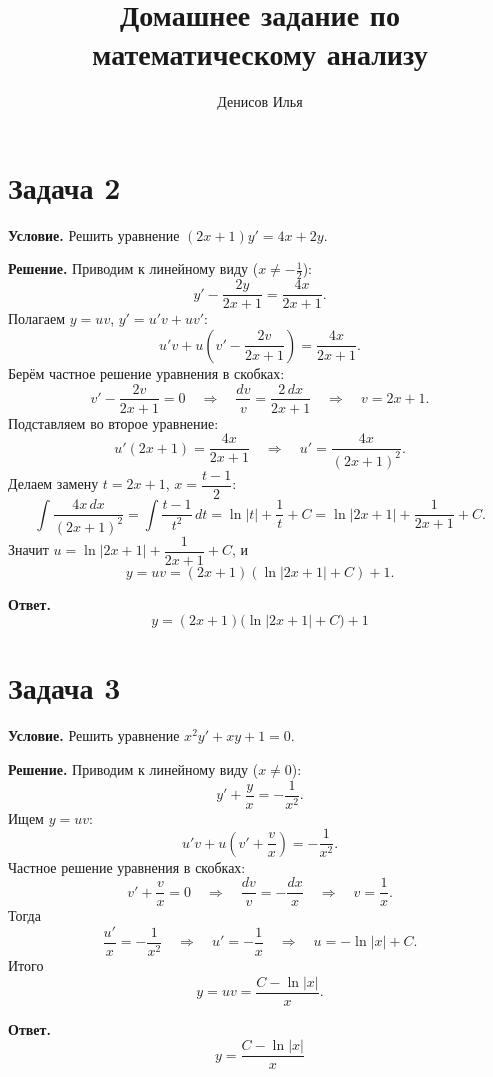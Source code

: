 \documentclass[12pt]{article}
\title{Домашнее задание по математическому анализу}
\author{Денисов Илья}
\date{}
\begin{document}
	\maketitle

	\section*{Задача 2}

	\noindent
	\textbf{Условие.} Решить уравнение $(2x+1)y' = 4x + 2y$.

	\noindent
	\textbf{Решение.} Приводим к линейному виду ($x \ne -\tfrac{1}{2}$):
	\[
		y' - \frac{2y}{2x+1} = \frac{4x}{2x+1}.
	\]
	Полагаем $y = uv$, $y' = u'v + uv'$:
	\[
		u'v + u\left( v' - \frac{2v}{2x+1} \right) = \frac{4x}{2x+1}.
	\]
	Берём частное решение уравнения в скобках:
	\[
		v' - \frac{2v}{2x+1} = 0 \quad \Longrightarrow \quad \frac{dv}{v} = \frac{2\,dx}{2x+1} \quad \Longrightarrow \quad v = 2x+1.
	\]
	Подставляем во второе уравнение:
	\[
		u'(2x+1) = \frac{4x}{2x+1} \quad \Longrightarrow \quad u' = \frac{4x}{(2x+1)^2}.
	\]
	Делаем замену $t = 2x+1$, $x = \dfrac{t-1}{2}$:
	\[
		\int \frac{4x\,dx}{(2x+1)^2} = \int \frac{t-1}{t^2}\,dt = \ln|t| + \frac{1}{t} + C = \ln|2x+1| + \frac{1}{2x+1} + C.
	\]
	Значит $u = \ln|2x+1| + \dfrac{1}{2x+1} + C$, и
	\[
		y = uv = (2x+1)\left( \ln|2x+1| + C \right) + 1.
	\]

	\medskip
	\noindent
	\textbf{Ответ.}
	\[
		\boxed{y = (2x+1)\bigl(\ln|2x+1| + C\bigr) + 1}
	\]

	\section*{Задача 3}

	\noindent
	\textbf{Условие.} Решить уравнение $x^2y' + xy + 1 = 0$.

	\noindent
	\textbf{Решение.} Приводим к линейному виду ($x \ne 0$):
	\[
		y' + \frac{y}{x} = -\frac{1}{x^2}.
	\]
	Ищем $y = uv$:
	\[
		u'v + u\left( v' + \frac{v}{x} \right) = -\frac{1}{x^2}.
	\]
	Частное решение уравнения в скобках:
	\[
		v' + \frac{v}{x} = 0 \quad \Longrightarrow \quad \frac{dv}{v} = -\frac{dx}{x} \quad \Longrightarrow \quad v = \frac{1}{x}.
	\]
	Тогда
	\[
		\frac{u'}{x} = -\frac{1}{x^2} \quad \Longrightarrow \quad u' = -\frac{1}{x} \quad \Longrightarrow \quad u = -\ln|x| + C.
	\]
	Итого
	\[
		y = uv = \frac{C - \ln|x|}{x}.
	\]

	\medskip
	\noindent
	\textbf{Ответ.}
	\[
		\boxed{y = \dfrac{C - \ln|x|}{x}}
	\]
\end{document}
